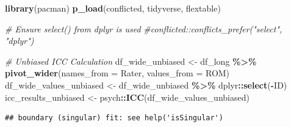 \documentclass[
]{book}
\newenvironment{Shaded}{\begin{snugshade}}{\end{snugshade}}
\newcommand{\AttributeTok}[1]{\textcolor[rgb]{0.13,0.29,0.53}{#1}}
\newcommand{\CommentTok}[1]{\textcolor[rgb]{0.56,0.35,0.01}{\textit{#1}}}
\newcommand{\FunctionTok}[1]{\textcolor[rgb]{0.13,0.29,0.53}{\textbf{#1}}}
\newcommand{\NormalTok}[1]{#1}
\newcommand{\OtherTok}[1]{\textcolor[rgb]{0.56,0.35,0.01}{#1}}
\newcommand{\SpecialCharTok}[1]{\textcolor[rgb]{0.81,0.36,0.00}{\textbf{#1}}}
\begin{document}
\begin{Shaded}
\begin{Highlighting}[]
\FunctionTok{library}\NormalTok{(pacman)}
\FunctionTok{p\_load}\NormalTok{(conflicted, tidyverse, flextable)}

\CommentTok{\# Ensure select() from dplyr is used}
\CommentTok{\#conflicted::conflicts\_prefer("select", "dplyr")}

\CommentTok{\# Unbiased ICC Calculation}
\NormalTok{df\_wide\_unbiased }\OtherTok{\textless{}{-}}\NormalTok{ df\_long }\SpecialCharTok{\%\textgreater{}\%}
  \FunctionTok{pivot\_wider}\NormalTok{(}\AttributeTok{names\_from =}\NormalTok{ Rater, }\AttributeTok{values\_from =}\NormalTok{ ROM)}
\NormalTok{df\_wide\_values\_unbiased }\OtherTok{\textless{}{-}}\NormalTok{ df\_wide\_unbiased }\SpecialCharTok{\%\textgreater{}\%}\NormalTok{ dplyr}\SpecialCharTok{::}\FunctionTok{select}\NormalTok{(}\SpecialCharTok{{-}}\NormalTok{ID)}
\NormalTok{icc\_results\_unbiased }\OtherTok{\textless{}{-}}\NormalTok{ psych}\SpecialCharTok{::}\FunctionTok{ICC}\NormalTok{(df\_wide\_values\_unbiased)}
\end{Highlighting}
\end{Shaded}

\begin{verbatim}
## boundary (singular) fit: see help('isSingular')
\end{verbatim}
\end{document}
